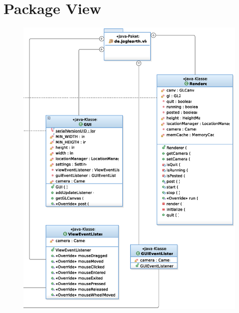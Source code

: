 \documentclass[10pt]{scrreprt}
\begin{document}
\section{Package View}
\begin{figure}[!htb]
	\includegraphics[scale=0.7]{JoglDiagramm_View.eps}
\vspace{2.0 cm}
\end{figure}
\end{document}
